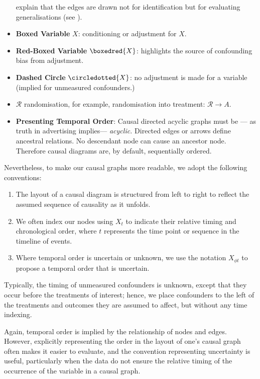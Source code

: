 \documentclass[
  single column]{article}
\providecommand{\tightlist}{%
  \setlength{\itemsep}{0pt}\setlength{\parskip}{0pt}}\usepackage{longtable,booktabs,array}
\begin{document}
\begin{itemize}
  explain that the edges are drawn not for identification but for
  evaluating generalisations (see
  ).
\item
  \textbf{Boxed Variable} \(\boxed{X}\): conditioning or adjustment for
  \(X\).
\item
  \textbf{Red-Boxed Variable} \(\boxedred{X}\): highlights the source of
  confounding bias from adjustment.
\item
  \textbf{Dashed Circle} \(\circledotted{X}\): no adjustment is made for
  a variable (implied for unmeasured confounders.)
\item
  \textbf{\(\mathbf{\mathcal{R}}\)} randomisation, for example,
  randomisation into treatment: \(\mathcal{R} \rightarrow A\).
\item
  \textbf{Presenting Temporal Order}: Causal directed acyclic graphs
  must be --- as truth in advertising implies--- \emph{acyclic.}
  Directed edges or arrows define ancestral relations. No descendant
  node can cause an ancestor node. Therefore causal diagrams are, by
  default, sequentially ordered.
\end{itemize}

Nevertheless, to make our causal graphs more readable, we adopt the
following conventions:

\begin{enumerate}
\def\labelenumi{\arabic{enumi}.}
\tightlist
\item
  The layout of a causal diagram is structured from left to right to
  reflect the assumed sequence of causality as it unfolds.
\item
  We often index our nodes using \(X_t\) to indicate their relative
  timing and chronological order, where \(t\) represents the time point
  or sequence in the timeline of events.
\item
  Where temporal order is uncertain or unknown, we use the notation
  \(X_{\phi t}\) to propose a temporal order that is uncertain.
\end{enumerate}

Typically, the timing of unmeasured confounders is unknown, except that
they occur before the treatments of interest; hence, we place
confounders to the left of the treatments and outcomes they are assumed
to affect, but without any time indexing.

Again, temporal order is implied by the relationship of nodes and edges.
However, explicitly representing the order in the layout of one's causal
graph often makes it easier to evaluate, and the convention representing
uncertainty is useful, particularly when the data do not ensure the
relative timing of the occurrence of the variable in a causal graph.
\end{document}
